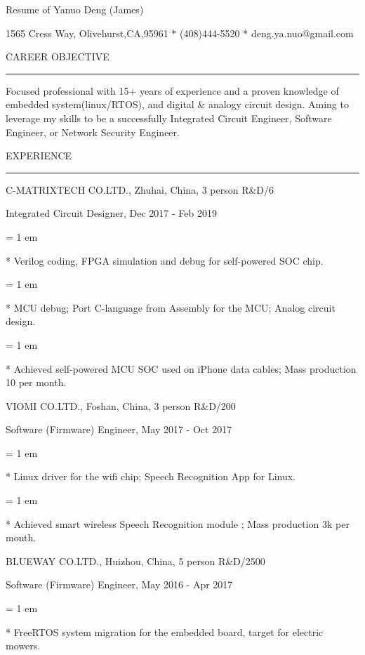 

\centerline{ \FFbg
Resume of Yanuo Deng (James)
}

\centerline{ %
1565 Cress Way, Olivehurst,CA,95961
*
(408)444-5520
*
deng.ya.nuo@gmail.com
}

{ \medbreak } { \FFbg
CAREER OBJECTIVE
}

{ \smallbreak } {\par\noindent\hrule} { \smallbreak }

    Focused professional with 15+ years of experience 
and a proven knowledge of embedded system(linux/RTOS), 
and digital \& analogy circuit design. 
    Aming to leverage my skills to be a successfully 
Integrated Circuit Engineer, 
Software Engineer, 
or Network Security Engineer.

{ \medbreak } { \FFbg
EXPERIENCE
}
{ \smallbreak } {\par\noindent\hrule} { \smallbreak }

{ \medbreak } { \FFbg
C-MATRIXTECH CO.LTD., Zhuhai, China, 3 person R\&D/6
}

{ \FFte
Integrated Circuit Designer, Dec 2017 - Feb 2019
}

{ \parindent = 1 em \item{*} 
 Verilog coding, FPGA simulation and debug for self-powered SOC chip. 
}

{ \parindent = 1 em \item{*} 
 MCU debug; Port C-language from Assembly for the MCU; Analog circuit design.
}
{ \parindent = 1 em \item{*} 
 Achieved self-powered MCU SOC used on iPhone data cables; Mass production 10 per month.
}

{ \medbreak } { \FFbg
VIOMI CO.LTD., Foshan, China, 3 person R\&D/200
}

{ \FFte
Software (Firmware) Engineer, May 2017 - Oct 2017
}

{ \parindent = 1 em \item{*} 
 Linux driver for the wifi chip; Speech Recognition App for Linux.
 }
{ \parindent = 1 em \item{*} 
 Achieved smart wireless Speech Recognition module ; Mass production 3k per month.
 }

{ \medbreak } { \FFbg
BLUEWAY CO.LTD., Huizhou, China, 5 person R\&D/2500
}

{ \FFte
Software (Firmware) Engineer, May 2016 - Apr 2017
}
{ \parindent = 1 em \item{*} 
 FreeRTOS system migration for the embedded board, target for electric mowers.
 }

